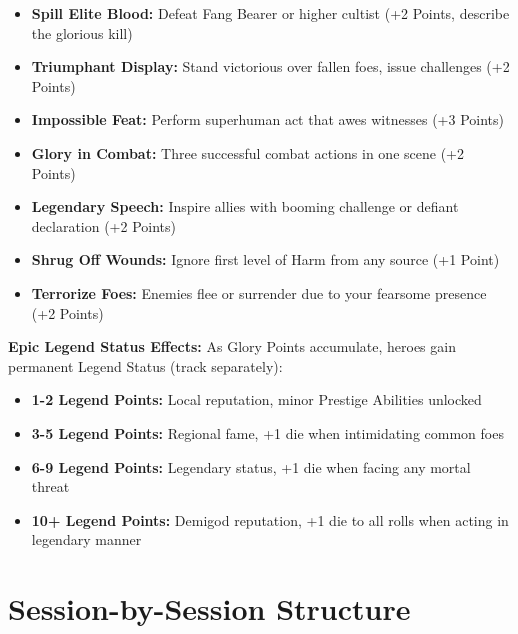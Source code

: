 \documentclass[11pt]{article}
\begin{document}
\begin{itemize}
  \begin{itemize}
  \item \textbf{Spill Elite Blood:} Defeat Fang Bearer or higher cultist (+2 Points, describe the glorious kill)
  \item \textbf{Triumphant Display:} Stand victorious over fallen foes, issue challenges (+2 Points)
  \item \textbf{Impossible Feat:} Perform superhuman act that awes witnesses (+3 Points)
  \item \textbf{Glory in Combat:} Three successful combat actions in one scene (+2 Points)
  \item \textbf{Legendary Speech:} Inspire allies with booming challenge or defiant declaration (+2 Points)
  \item \textbf{Shrug Off Wounds:} Ignore first level of Harm from any source (+1 Point)
  \item \textbf{Terrorize Foes:} Enemies flee or surrender due to your fearsome presence (+2 Points)
  \end{itemize}
\end{itemize}

\textbf{Epic Legend Status Effects:}
As Glory Points accumulate, heroes gain permanent Legend Status (track separately):
\begin{itemize}
\item \textbf{1-2 Legend Points:} Local reputation, minor Prestige Abilities unlocked
\item \textbf{3-5 Legend Points:} Regional fame, +1 die when intimidating common foes
\item \textbf{6-9 Legend Points:} Legendary status, +1 die when facing any mortal threat
\item \textbf{10+ Legend Points:} Demigod reputation, +1 die to all rolls when acting in legendary manner
\end{itemize}

\section{Session-by-Session Structure}
\end{document}
